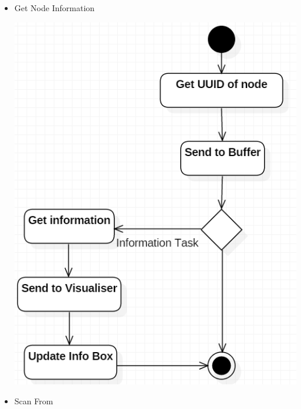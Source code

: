 \documentclass[a4paper,12pt]{report}
\begin{document}
\begin{itemize}
\begin{center}
		\end{center}
	\item Get Node Information
		\begin{center}
	 	\includegraphics[width=1\textwidth] {./Diagrams/GetNodeInformationSequence.png}\\[0.4cm]
		\end{center}
	\item Scan From
		\begin{center}

\end{center}
\end{itemize}
\end{document}

